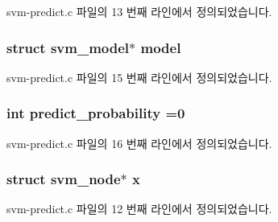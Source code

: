 svm-\/predict.\+c 파일의 13 번째 라인에서 정의되었습니다.

\hypertarget{svm-predict_8c_a50c87b127b14787341e9630f4f5c700a}{
\subsubsection[{model}]{\setlength{\rightskip}{0pt plus 5cm}struct {\bf svm\+\_\+model}$\ast$ model}}\label{svm-predict_8c_a50c87b127b14787341e9630f4f5c700a}


svm-\/predict.\+c 파일의 15 번째 라인에서 정의되었습니다.

\hypertarget{svm-predict_8c_a1501132f5226b295e5300d74da55a2b9}{
\subsubsection[{predict\+\_\+probability}]{\setlength{\rightskip}{0pt plus 5cm}int predict\+\_\+probability =0}}\label{svm-predict_8c_a1501132f5226b295e5300d74da55a2b9}


svm-\/predict.\+c 파일의 16 번째 라인에서 정의되었습니다.

\hypertarget{svm-predict_8c_a9a5b72a4065074cac5da07efb80a1e79}{
\subsubsection[{x}]{\setlength{\rightskip}{0pt plus 5cm}struct {\bf svm\+\_\+node}$\ast$ x}}\label{svm-predict_8c_a9a5b72a4065074cac5da07efb80a1e79}


svm-\/predict.\+c 파일의 12 번째 라인에서 정의되었습니다.

